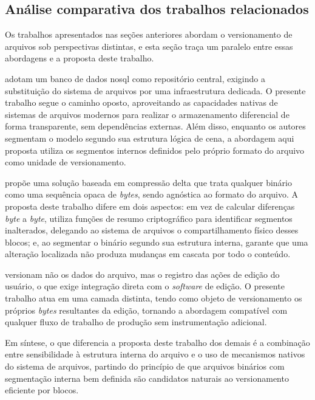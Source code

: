 \subsection{Análise comparativa dos trabalhos relacionados}

Os trabalhos apresentados nas seções anteriores abordam o versionamento de arquivos
sob perspectivas distintas, e esta seção traça um paralelo entre essas abordagens e
a proposta deste trabalho.

 adotam um banco de dados \gls{nosql} como repositório
central, exigindo a substituição do sistema de arquivos por uma infraestrutura
dedicada. O presente trabalho segue o caminho oposto, aproveitando as capacidades
nativas de sistemas de arquivos modernos para realizar o armazenamento diferencial
de forma transparente, sem dependências externas. Além disso, enquanto os autores
segmentam o modelo segundo sua estrutura lógica de cena, a abordagem aqui proposta
utiliza os segmentos internos definidos pelo próprio formato do arquivo como unidade
de versionamento.

 propõe uma solução baseada em compressão delta que trata
qualquer binário como uma sequência opaca de \textit{bytes}, sendo agnóstica ao
formato do arquivo. A proposta deste trabalho difere em dois aspectos: em vez de
calcular diferenças \textit{byte} a \textit{byte}, utiliza funções de resumo
criptográfico para identificar segmentos inalterados, delegando ao sistema de
arquivos o compartilhamento físico desses blocos; e, ao segmentar o binário segundo
sua estrutura interna, garante que uma alteração localizada não produza mudanças em
cascata por todo o conteúdo.

 versionam não os dados do arquivo, mas o registro das ações de
edição do usuário, o que exige integração direta com o \textit{software} de edição.
O presente trabalho atua em uma camada distinta, tendo como objeto de versionamento
os próprios \textit{bytes} resultantes da edição, tornando a abordagem compatível
com qualquer fluxo de trabalho de produção sem instrumentação adicional.

Em síntese, o que diferencia a proposta deste trabalho dos demais é a combinação
entre sensibilidade à estrutura interna do arquivo e o uso de mecanismos nativos do
sistema de arquivos, partindo do princípio de que arquivos binários com segmentação
interna bem definida são candidatos naturais ao versionamento eficiente por blocos.